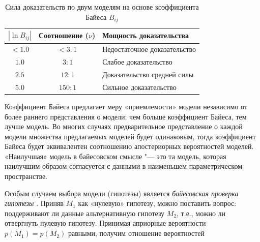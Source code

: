 \begin{table} [ht]%
	\caption{Сила доказательств по двум моделям на основе коэффициента Байеса $B_{ij}$}%
	\label{tbl:bayescoef}%
    \setlength\extrarowheight{0pt} %
    \setlength{\tymin}{2.3cm}%
    \begin{center}

	\begin{tabulary}{\textwidth}{@{}>{\zz}C >{\zz}C >{\zz}L@{}}%
        \toprule     %
    	$ |\ln B_{ij}| $ &
    	Соотношение ($\nu$) &
    	Мощность доказательства	\\
        \midrule %
        $<1.0$ &
        $<3:1$  &
        Недостаточное доказательство 
        \\
        \midrule
        $ 1.0 $ &
        $ ~3:1 $  &
        Слабое  доказательство 
        \\
        \midrule
        $2.5$ &
        $~12:1$  &
        Доказательство средней силы 
        \\
        \midrule
        $5.0$ &
        $~150:1$  &
        Сильное доказательство 
        \\
        \bottomrule %
	\end{tabulary}%
 \end{center}
\end{table}

Коэффициент Байеса предлагает меру «приемлемости» модели независимо от более раннего представления о модели; 
чем больше коэффициент Байеса, тем лучше модель. Во многих случаях предварительное представление о каждой модели 
множества предлагаемых моделей будет одинаковым, тогда коэффициент Байеса будет эквивалентен соотношению апостериорных 
вероятностей моделей. «Наилучшая» модель в байесовском смысле "--- это та модель, которая наилучшим образом 
согласуется с данными в наименьшем параметрическом пространстве.

Особым случаем выбора модели (гипотезы) является \textit{байесовская проверка гипотезы} 
\cite{ivezic2019statistics, rouder2009bayesian}. Приняв $M_1$ как «нулевую» гипотезу, можно поставить вопрос: 
поддерживают ли данные альтернативную гипотезу $M_2$, т.е., можно ли отвергнуть нулевую гипотезу. Принимая априорные 
вероятности $p(M_1) = p(M_2)$ равными, получим отношение вероятностей

